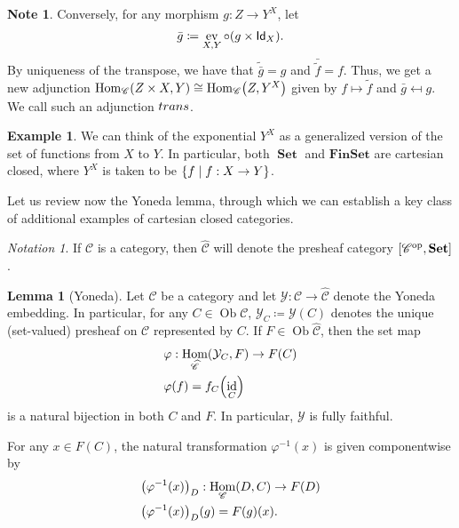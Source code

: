 \documentclass[10pt,letterpaper,cm]{nupset}
\theoremstyle{definition}
\newtheorem{exmp}[definition]{Example}
\newtheorem{note}[definition]{Note}
\theoremstyle{theorem}
\newtheorem{lemma}[definition]{Lemma}
\theoremstyle{remark}
\newtheorem*{notation}{Notation}
\DeclareMathOperator{\ob}{Ob}
\DeclareMathOperator{\ev}{ev}
\newcommand{\id}{\mathsf{Id}}
\newcommand{\0}{\mathbf{0}}
\newcommand{\1}{\mathbf{1}}
\newcommand{\2}{\mathbf{2}}
\DeclareMathOperator{\op}{op}
\DeclareMathOperator{\set}{\mathbf{Set}}
\renewcommand{\c}{\mathscr{C}}
\DeclareMathOperator{\Hom}{Hom}
\DeclareMathOperator{\idd}{id}
\DeclareMathOperator{\trans}{\mathnormal{trans}}
\begin{document}
\begin{note}\label{trans}
Conversely, for any morphism $g: Z \to Y^X$, let $$\bar{g} \coloneqq \ev_{X, Y} \circ \mleft(g \times \id_X\mright).$$ By uniqueness of the transpose, we have that $\tilde{\bar{g}} = g$ and $\bar{\tilde{f}} = f$. Thus, we get a new adjunction $\Hom_{\c}\mleft(Z \times X, Y\mright) \cong \Hom_{\c}\mleft(Z, Y^X\mright)$ given by $f \mapsto  \tilde{f}$ and $\bar{g} \mapsfrom g$. We call such an adjunction $\trans$.
\end{note}

\smallskip

\begin{exmp} We can think of the exponential $Y^X$  as a generalized version of the set of functions from $X$ to $Y$. In particular, both
 $\set$ and $\mathbf{FinSet}$ are cartesian closed, where $Y^X$ is taken to be $\mleft\{f \mid f: X \to Y\mright\}$.
\end{exmp}

\smallskip

Let us review now the Yoneda lemma, through which we can  establish a key class of additional examples of cartesian closed categories.

\begin{notation}
If $\c$ is a category, then $\widehat{\c}$ will denote the presheaf category $ \mleft[\c^{\op}, \set\mright]$.
\end{notation}

\begin{lemma}[Yoneda]\label{Yoneda}
Let $\c$ be a category and let $\mathcal{Y}: \c \to \widehat{\c}$ denote the Yoneda embedding. In particular, for any $C\in \ob{\c}$, $\mathcal{Y}_C\coloneqq \mathcal{Y}(C)$ denotes the unique (set-valued) presheaf on $\c$ represented by $C$. If $F \in \ob{\widehat{\c}}$, then the set map 
\begin{align*}
& \varphi:  \Hom_{\widehat{\c}}(\mathcal{Y}_C, F) \to F(C)
\\ & \varphi(f) = f_C\mleft(\idd_C\mright)
\end{align*}
 is a natural bijection in both $C$ and $F$. In particular, $\mathcal{Y}$ is fully faithful.
\end{lemma}

For any $x\in F(C)$, the natural transformation $\varphi^{-1}(x)$ is given componentwise by
\begin{align*}
& \mleft(\varphi^{-1}(x)\mright)_D : \Hom_{\c}(D, C) \to F(D)
\\ & \mleft(\varphi^{-1}(x)\mright)_D(g) = F(g)(x).
\end{align*}
\end{document}
